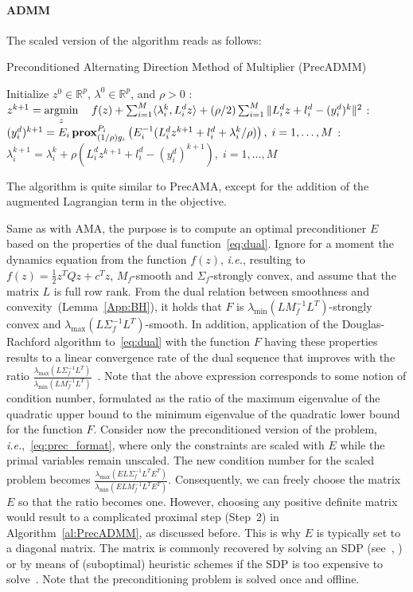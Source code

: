 \documentclass[openany]{now}
\newcommand{\ie}{{\it i.e.}}
\newcommand{\reals}{{\mathbb R}}
\newcommand{\argmin}{\mathop{\rm argmin}}
\newcommand{\prox}{\mathop{\bf prox}}
\begin{document}
\paragraph*{ADMM} The scaled version of the algorithm reads as follows:
\begin{algorithm}[H]
\caption{Preconditioned Alternating Direction Method of Multiplier (PrecADMM)}
\label{al:PrecADMM}
\begin{algorithmic} 
\REQUIRE Initialize $z^{0}\in \reals^{p}$, $\lambda^{0}\in \reals^{p}$, and $\rho > 0$
\LOOP
{}: $z^{k+1} = \argmin\limits_z \quad f(z) + \sum_{i=1}^M \langle  \lambda_i^k, L^d_i z\rangle  + (\rho/2)\sum_{i=1}^M\|L^d_i z + l^d_i - (y^d_i)^k\|^{2}$
: $(y_i^d)^{k+1} = E_i \prox^{P_i}_{(1/\rho)g_i}\left(E_i^{-1}(L^d_iz^{k+1}+l^d_i+\lambda_i^k/\rho)\right), \; i=1,\ldots,M$
: $\lambda^{k+1}_i = \lambda_i^k + \rho(L^d_i z^{k+1} + l^d_i - (y_i^d)^{k+1}),\; i=1,\ldots,M$
\ENDLOOP
\end{algorithmic}
\end{algorithm}\begin{footnotesize}
\end{footnotesize} 
The algorithm is quite similar to PrecAMA, except for the addition of the augmented Lagrangian term in the objective.

Same as with AMA, the purpose is to compute an optimal preconditioner $E$ based on the properties of the dual function~\eqref{eq:dual}. 
Ignore for a moment the dynamics equation from the function $f(z)$, \ie, resulting to $f(z)=\frac{1}{2}z^TQz+c^Tz$, $M_f$-smooth and $\Sigma_f$-strongly convex, and assume that the matrix $L$ is full row rank. From the dual relation between smoothness and convexity~(Lemma~\ref{App:BH}), it holds that $F$ is $\lambda_{\min}(LM_f^{-1}L^T)$-strongly convex and $\lambda_{\max}(L\Sigma_f^{-1}L^T)$-smooth. In addition, application of the Douglas-Rachford algorithm to~\eqref{eq:dual} with the function $F$ having these properties results to a linear convergence rate of the dual sequence that improves with the ratio $\frac{\lambda_{\max}(L\Sigma_f^{-1}L^T)}{\lambda_{\min}(LM_f^{-1}L^T)}$~\cite[Proposition~6]{giselsson2014metric}. Note that the above expression corresponds to some notion of condition number, formulated as the ratio of the maximum eigenvalue of the quadratic upper bound to the minimum eigenvalue of the quadratic lower bound for the function $F$. Consider now the preconditioned version of the problem, \ie,~\eqref{eq:prec_format}, where only the constraints are scaled with $E$ while the primal variables remain unscaled. The new condition number for the scaled problem becomes $\frac{\lambda_{\max}(EL\Sigma_f^{-1}L^TE^T)}{\lambda_{\min}(ELM_f^{-1}L^TE^T)}$. Consequently, we can freely choose the matrix $E$ so that the ratio becomes one. However, choosing any positive definite matrix would result to a complicated proximal step (Step~2) in Algorithm~\ref{al:PrecADMM}, as discussed before. This is why $E$ is typically set to a diagonal matrix. The matrix is commonly recovered by solving an SDP (see~\cite{ghadimi2013optimal}, \cite{giselsson2014metric}) or by means of (suboptimal) heuristic schemes if the SDP is too expensive to solve~\cite{Giselsson:fbds}. Note that the preconditioning problem is solved once and offline.
\end{document}
